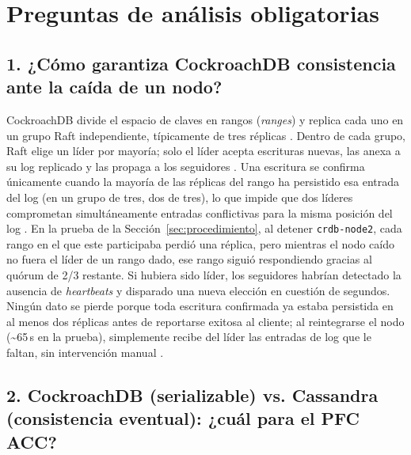 \documentclass[11pt,a4paper]{article}
\begin{document}
\section{Preguntas de análisis obligatorias}
\label{sec:analisis}

\subsection*{1. ¿Cómo garantiza CockroachDB consistencia ante la caída de un nodo?}

CockroachDB divide el espacio de claves en rangos (\emph{ranges}) y replica
cada uno en un grupo Raft independiente, típicamente de tres réplicas
\cite{taft2020}. Dentro de cada grupo, Raft elige un líder por mayoría;
solo el líder acepta escrituras nuevas, las anexa a su log replicado y las
propaga a los seguidores \cite{ongaro2014}. Una escritura se confirma
únicamente cuando la mayoría de las réplicas del rango ha persistido esa
entrada del log (en un grupo de tres, dos de tres), lo que impide que
dos líderes comprometan simultáneamente entradas conflictivas para la misma
posición del log \cite{ongaro2014}. En la prueba de la
Sección~\ref{sec:procedimiento}, al detener \texttt{crdb-node2}, cada rango
en el que este participaba perdió una réplica, pero mientras el nodo caído
no fuera el líder de un rango dado, ese rango siguió respondiendo gracias al
quórum de 2/3 restante. Si hubiera sido líder, los seguidores habrían
detectado la ausencia de \emph{heartbeats} y disparado una nueva elección en
cuestión de segundos. Ningún dato se pierde porque toda escritura confirmada
ya estaba persistida en al menos dos réplicas antes de reportarse exitosa al
cliente; al reintegrarse el nodo (\textasciitilde{}65\,s en la prueba),
simplemente recibe del líder las entradas de log que le faltan, sin
intervención manual \cite{taft2020,ongaro2014}.

\subsection*{2. CockroachDB (serializable) vs. Cassandra (consistencia eventual): ¿cuál para el PFC ACC?}
\end{document}

